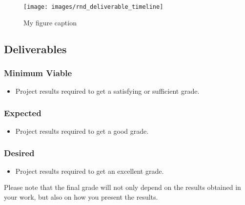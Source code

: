 \documentclass[rnd]{mas_proposal}
\begin{document}
\begin{figure}[h!]
    \texttt{[image: images/rnd\_deliverable\_timeline]}
    \caption{My figure caption}
    \label{fig:myfigure}
\end{figure}

\subsection{Deliverables}

\subsubsection*{Minimum Viable}
\begin{itemize}
    \item Project results required to get a satisfying or sufficient grade.
\end{itemize}

\subsubsection*{Expected}
\begin{itemize}
    \item Project results required to get a good grade.
\end{itemize}

\subsubsection*{Desired}
\begin{itemize}
    \item Project results required to get an excellent grade.
\end{itemize}

Please note that the final grade will not only depend on the results obtained in your work, but also on how you present the results.

\nocite{*}

\end{document}
